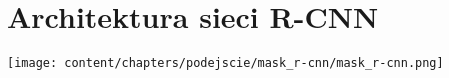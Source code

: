 \section{Architektura sieci R-CNN}

\texttt{[image: content/chapters/podejscie/mask\_r-cnn/mask\_r-cnn.png]}
